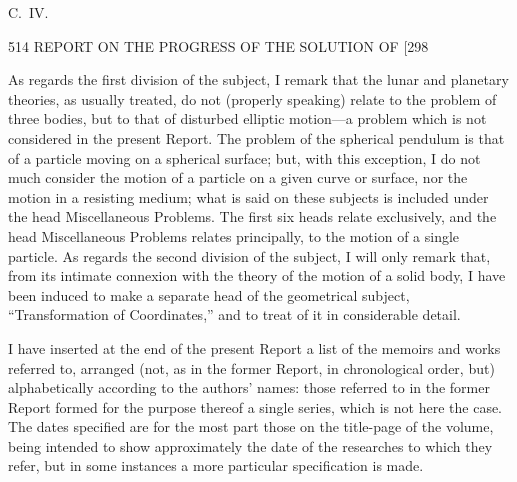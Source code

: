 \documentclass[11pt]{article}
\begin{document}
\vfill
\begin{flushright}\small C.\ IV.\end{flushright}

\newpage
\begin{center}
514 \hfill REPORT ON THE PROGRESS OF THE SOLUTION OF \hfill [298
\end{center}

As regards the first division of the subject, I remark that the lunar and planetary theories, as usually treated, do not (properly speaking) relate to the problem of three bodies, but to that of disturbed elliptic motion---a problem which is not considered in the present Report. The problem of the spherical pendulum is that of a particle moving on a spherical surface; but, with this exception, I do not much consider the motion of a particle on a given curve or surface, nor the motion in a resisting medium; what is said on these subjects is included under the head Miscellaneous Problems. The first six heads relate exclusively, and the head Miscellaneous Problems relates principally, to the motion of a single particle. As regards the second division of the subject, I will only remark that, from its intimate connexion with the theory of the motion of a solid body, I have been induced to make a separate head of the geometrical subject, ``Transformation of Coordinates,'' and to treat of it in considerable detail.

I have inserted at the end of the present Report a list of the memoirs and works referred to, arranged (not, as in the former Report, in chronological order, but) alphabetically according to the authors' names: those referred to in the former Report formed for the purpose thereof a single series, which is not here the case. The dates specified are for the most part those on the title-page of the volume, being intended to show approximately the date of the researches to which they refer, but in some instances a more particular specification is made.
\end{document}
